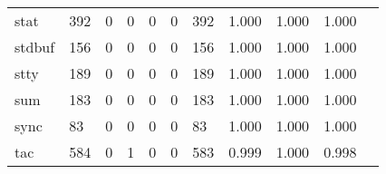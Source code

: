 \begin{longtable}{lp{1.2cm}p{1.2cm}p{1.2cm}p{1.2cm}p{1.2cm}p{1.2cm}p{1.2cm}p{1.2cm}p{1.2cm}p{1.2cm}}
stat      &                                   392 &                                                  0 &                                                  0 &                                                  0 &                                                  0 &                                                392 &                                         1.000 &                                              1.000 &                                              1.000 \\
stdbuf    &                                   156 &                                                  0 &                                                  0 &                                                  0 &                                                  0 &                                                156 &                                         1.000 &                                              1.000 &                                              1.000 \\
stty      &                                   189 &                                                  0 &                                                  0 &                                                  0 &                                                  0 &                                                189 &                                         1.000 &                                              1.000 &                                              1.000 \\
sum       &                                   183 &                                                  0 &                                                  0 &                                                  0 &                                                  0 &                                                183 &                                         1.000 &                                              1.000 &                                              1.000 \\
sync      &                                    83 &                                                  0 &                                                  0 &                                                  0 &                                                  0 &                                                 83 &                                         1.000 &                                              1.000 &                                              1.000 \\
tac       &                                   584 &                                                  0 &                                                  1 &                                                  0 &                                                  0 &                                                583 &                                         0.999 &                                              1.000 &                                              0.998 \\

\end{longtable}
